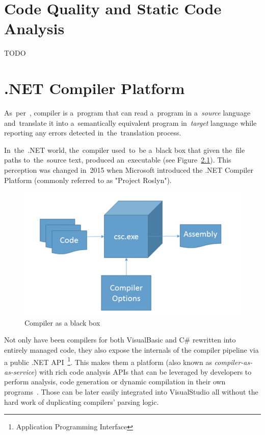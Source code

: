 \documentclass[
  digital, %
  table,   %
  lof,     %
  lot,     %
  oneside,
]{fithesis3}
\begin{document}
  \chapter{Code Quality and Static Code Analysis}
TODO

  \chapter{.NET Compiler Platform}
As~per~\cite{dragon-book}, compiler is a~program that can read a~program in a~\textit{source} language and~translate it into a~semantically equivalent program in~\textit{target} language while reporting any errors detected in~the~translation process. 

In~the~.NET world, the~compiler used~to~be a~black box that given the~file paths to~the~source text, produced an~executable (see Figure~\ref{fig:compiler-as-a-black-box}). This perception was changed in~2015 when Microsoft introduced the .NET Compiler Platform (commonly referred to as "Project Roslyn").  

\begin{figure}[h!]
		\centering
			\includegraphics[scale=0.35]{img/compiler-as-a-black-box}
		\caption{Compiler as a black box~\cite{dot-net-development-using-the-compiler-api}}
		\label{fig:compiler-as-a-black-box}
\end{figure}

Not only have been compilers for both VisualBasic and C\# rewritten into entirely managed code, they also expose the internals of the compiler pipeline via a public .NET API~\footnote{Application Programming Interface}. This makes them a platform (also known as \textit{compiler-as-as-service}) with rich code analysis APIs that can be leveraged by developers to perform analysis, code generation or dynamic compilation in their own programs~\cite{roslyn-succinctly}. Those can be later easily integrated into VisualStudio all without the hard work of duplicating compilers' parsing logic.
\end{document}
